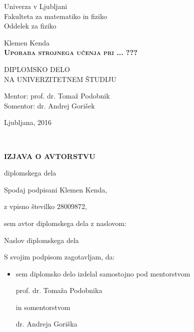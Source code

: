 \thispagestyle{empty} 

\begin{center}
{\large 
Univerza v Ljubljani\\
Fakulteta za matematiko in fiziko\\
Oddelek za fiziko
}

\vspace{3cm}
{\LARGE Klemen Kenda}\\

\vspace{2cm}
\textsc{\textbf{\LARGE 
Uporaba strojnega učenja pri ... ??? }}

\vspace{2cm}
{ DIPLOMSKO DELO}\\
{ NA UNIVERZITETNEM ŠTUDIJU\\}

\vspace{2cm} 
{\Large Mentor: prof. dr. Tomaž Podobnik} \\
{\Large Somentor: dr. Andrej Gorišek}

\vfill
{\Large Ljubljana, 2016}
\end{center}

\newpage

\ \thispagestyle{empty}
\newpage

\thispagestyle{empty}

\vspace{1cm}
\begin{center} 
{\Large \textbf{IZJAVA O AVTORSTVU}}
\end{center}

\begin{center} 
{\Large diplomskega dela}
\end{center}

\vspace{1cm}
Spodaj podpisani \hspace{0.5cm} Klemen Kenda,

\vspace{0.5cm}
z vpisno številko \hspace{0.65cm} 28009872,

\vspace{1cm}
sem avtor diplomskega dela z naslovom:
   
\vspace{0.5cm}
Naslov diplomskega dela 

\vspace{1.5cm}
S svojim podpisom zagotavljam, da:
\begin{itemize}
	\item sem diplomsko delo izdelal samostojno pod mentorstvom 
	
	prof. dr. Tomaža Podobnika
	
	in somentorstvom 
	
	dr. Andreja Goriška
	
\end{itemize}

